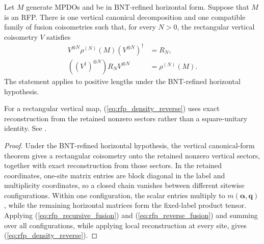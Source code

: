 \begin{lemma}%
    \label{thm:mpdo_topological_density_decomposition}
    \leanok
    Let $M$ generate MPDOs and be in BNT-refined horizontal
    form. Suppose that $M$ is an RFP.
    There is one vertical canonical decomposition and one compatible family of
    fusion coisometries such that, for every $N>0$, the rectangular vertical
    coisometry $V$ satisfies
    \begin{align}
        V^{\otimes N}\rho^{(N)}(M)(V^{\otimes N})^\dagger
         & =R_N,
        \label{eq:rfp_density_forward} \\
        ((V^\dagger)^{\otimes N})R_NV^{\otimes N}
         & =\rho^{(N)}(M).
        \label{eq:rfp_density_reverse}
    \end{align}
    The statement applies to positive lengths under the BNT-refined
    horizontal hypothesis.

    For a rectangular vertical map, (\ref{eq:rfp_density_reverse}) uses
    exact reconstruction from the retained nonzero sectors rather than a
    square-unitary identity. See
    \cite{gap:cpgsv17_vertical_isometry_zero_sector}.
\end{lemma}
\begin{proof}\leanok
    Under the BNT-refined horizontal hypothesis, the vertical
    canonical-form theorem gives a rectangular coisometry onto the retained
    nonzero vertical sectors, together with exact reconstruction from those
    sectors.
    In the retained coordinates, one-site matrix entries are block diagonal in
    the label and multiplicity coordinates, so a closed chain vanishes
    between different sitewise configurations. Within one configuration, the
    scalar entries multiply to
    $m(\boldsymbol\alpha,\boldsymbol q)$, while the remaining horizontal
    matrices form the fixed-label product tensor. Applying
    (\ref{eq:rfp_recursive_fusion}) and (\ref{eq:rfp_reverse_fusion}) and
    summing over all configurations, while applying local reconstruction at
    every site, gives (\ref{eq:rfp_density_reverse}).
\end{proof}

